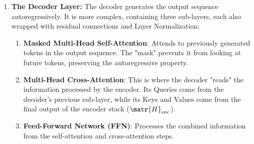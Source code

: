 \begin{enumerate}
\begin{figure}[ht+]
  \caption{Transformer Encoder layer architecture. Residual connections (curved arrows on the left) bypass each sub-layer, ensuring stable gradient flow. Pre-layer normalization is applied before each transformation.}
  \label{fig:encoder}
\end{figure}

    \item \textbf{The Decoder Layer:} The decoder generates the output sequence autoregressively. It is more complex, containing three sub-layers, each also wrapped with residual connections and Layer Normalization:
\begin{enumerate}
    \item \textbf{Masked Multi-Head Self-Attention}: Attends to previously generated tokens in the output sequence. The "mask" prevents it from looking at future tokens, preserving the autoregressive property.
    \item \textbf{Multi-Head Cross-Attention}: This is where the decoder "reads" the information processed by the encoder. Its Queries come from the decoder's previous sub-layer, while its Keys and Values come from the final output of the encoder stack ($\matr{H}_{\text{enc}}$).
    \item \textbf{Feed-Forward Network (FFN)}: Processes the combined information from the self-attention and cross-attention steps.
\end{enumerate}


\end{enumerate}

